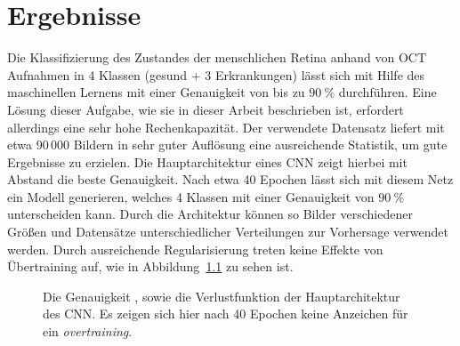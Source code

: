 \chapter{Ergebnisse}

Die Klassifizierung des Zustandes der menschlichen Retina anhand von OCT
Aufnahmen in 4 Klassen (gesund + 3 Erkrankungen) lässt sich mit Hilfe des
maschinellen Lernens mit einer Genauigkeit von bis zu $\SI{90}{\percent}$
durchführen. Eine Lösung dieser Aufgabe, wie sie in dieser Arbeit beschrieben
ist, erfordert allerdings eine sehr hohe Rechenkapazität. Der verwendete
Datensatz liefert mit etwa $90\,000$ Bildern in sehr guter Auflösung eine
ausreichende Statistik, um gute Ergebnisse zu erzielen.
Die Hauptarchitektur eines CNN zeigt hierbei mit Abstand die beste
Genauigkeit. Nach etwa 40 Epochen lässt sich mit diesem Netz ein
Modell generieren, welches 4 Klassen mit einer Genauigkeit von
$\SI{90}{\percent}$ unterscheiden kann. Durch die Architektur können so Bilder
verschiedener Größen und Datensätze unterschiedlicher Verteilungen zur
Vorhersage verwendet werden. Durch ausreichende Regularisierung treten keine
Effekte von Übertraining auf, wie in Abbildung~\ref{fig:hist} zu sehen
ist.
%
\begin{figure}[h!]
  \caption{Die Genauigkeit \protect{}, sowie die Verlustfunktion \protect{} der Hauptarchitektur des CNN. Es zeigen sich hier nach 40 Epochen keine Anzeichen für ein \textit{overtraining}.}
  \label{fig:hist}
\end{figure}
